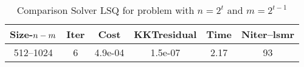 \documentclass[letterpaper,12pt,oneside,final]{book}
\begin{document}
\begin{table}
\caption{ Comparison Solver LSQ  for  problem with $n=2^{t}$ and $m=2^{t-1}$  } 
\begin{center}
\begin{tabular}{|*{6}{c}|} \hline
Size-$n\--m$ & \multicolumn{1}{c}{Iter} & \multicolumn{1}{c}{Cost}& \multicolumn{1}{c}{KKTresidual} & \multicolumn{1}{c}{Time} & \multicolumn{1}{c|}{Niter--lsmr} \\ 
\hline

512--1024      &6    &4.9e-04        &1.5e-07        &2.17           &93   \\ 

\hline
\end{tabular}
\end{center}
\end{table}
\end{document}
